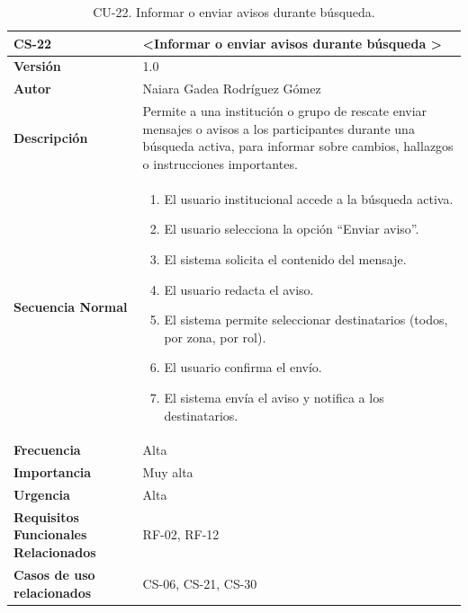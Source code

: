\begin{table}[htbp] %
\centering
\begin{tabular}{ |m{3cm}|m{11cm}|  } 
\hline
\cellcolor[HTML]{B9E3F0}\centering\textbf{CS-22} & \cellcolor[HTML]{B9E3F0}\textbf{\textless Informar o enviar avisos durante búsqueda \textgreater}\\

\hline
\cellcolor[HTML]{EFEFEF}\textbf{Versión}             & 1.0  \\
\hline
\cellcolor[HTML]{EFEFEF}\textbf{Autor}                & Naiara Gadea Rodríguez Gómez\\
\hline
\cellcolor[HTML]{EFEFEF}\textbf{Descripción}                & {Permite a una institución o grupo de rescate enviar mensajes o avisos a los participantes durante una búsqueda activa, para informar sobre cambios, hallazgos o instrucciones importantes.}\\
\hline
\cellcolor[HTML]{EFEFEF}\textbf{Secuencia \newline Normal}                &                 
        \begin{enumerate}
			\item El usuario institucional accede a la búsqueda activa.
			\item El usuario selecciona la opción “Enviar aviso”.
			\item El sistema solicita el contenido del mensaje.
			\item El usuario redacta el aviso.
			\item El sistema permite seleccionar destinatarios (todos, por zona, por rol).
			\item El usuario confirma el envío.
			\item El sistema envía el aviso y notifica a los destinatarios.
		\end{enumerate}\\
\hline
\cellcolor[HTML]{EFEFEF}\textbf{Frecuencia}                & Alta\\
\hline
\cellcolor[HTML]{EFEFEF}\textbf{Importancia}                & Muy alta\\
\hline
\cellcolor[HTML]{EFEFEF}\textbf{Urgencia}                & Alta\\
\hline
\cellcolor[HTML]{EFEFEF}\textbf{Requisitos Funcionales Relacionados}                & {RF-02, RF-12}\\
\hline
\cellcolor[HTML]{EFEFEF}\textbf{Casos de uso relacionados}                & {CS-06, CS-21, CS-30}\\
\hline
\end{tabular}
\caption{CU-22. Informar o enviar avisos durante búsqueda.}
\end{table}

